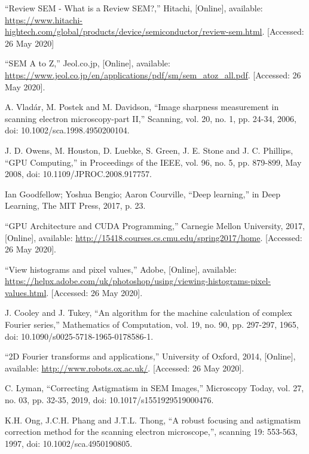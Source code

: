 \documentclass[12pt, twocolumn]{report}
\begin{document}
\begin{thebibliography}{00}
    ``Review SEM - What is a Review SEM?,'' Hitachi, [Online], available: \url{https://www.hitachi-hightech.com/global/products/device/semiconductor/review-sem.html}. [Accessed: 26 May 2020]

    ``SEM A to Z,'' Jeol.co.jp, [Online], available: \url{https://www.jeol.co.jp/en/applications/pdf/sm/sem_atoz_all.pdf}. [Accessed: 26 May 2020].

    A. Vladár, M. Postek and M. Davidson, ``Image sharpness measurement in scanning electron microscopy-part II,'' Scanning, vol. 20, no. 1, pp. 24-34, 2006, doi: 10.1002/sca.1998.4950200104.

    J. D. Owens, M. Houston, D. Luebke, S. Green, J. E. Stone and J. C. Phillips, ``GPU Computing,'' in Proceedings of the IEEE, vol. 96, no. 5, pp. 879-899, May 2008, doi: 10.1109/JPROC.2008.917757.

    Ian Goodfellow; Yoshua Bengio; Aaron Courville, ``Deep learning,'' in Deep Learning, The MIT Press, 2017, p. 23.

    ``GPU Architecture and CUDA Programming,'' Carnegie Mellon University, 2017, [Online], available: \url{http://15418.courses.cs.cmu.edu/spring2017/home}. [Accessed: 26 May 2020].

    ``View histograms and pixel values,'' Adobe, [Online], available: \url{https://helpx.adobe.com/uk/photoshop/using/viewing-histograms-pixel-values.html}. [Accessed: 26 May 2020].

    J. Cooley and J. Tukey, ``An algorithm for the machine calculation of complex Fourier series,'' Mathematics of Computation, vol. 19, no. 90, pp. 297-297, 1965, doi: 10.1090/s0025-5718-1965-0178586-1.

    ``2D Fourier transforms and applications,'' University of Oxford, 2014, [Online], available: \url{http://www.robots.ox.ac.uk/}. [Accessed: 26 May 2020].

    C. Lyman, ``Correcting Astigmatism in SEM Images,'' Microscopy Today, vol. 27, no. 03, pp. 32-35, 2019, doi: 10.1017/s1551929519000476.

    K.H. Ong, J.C.H. Phang and J.T.L. Thong, ``A robust focusing and astigmatism correction method for the scanning electron microscope,'', scanning 19: 553-563, 1997, doi: 10.1002/sca.4950190805.
\end{thebibliography}
\end{document}
